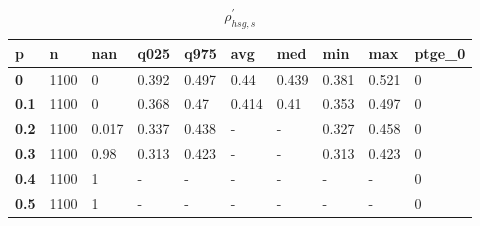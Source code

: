 \begin{table}[h]
 \centering 
\footnotesize
\caption{$\rho_{hsg,s}^\prime $}
\label{tab:alphahsgs}
\begin{tabular}[h]{|l|l|l|l|l|l|l|l|l|l|
    } \hline
\textbf{ p} & \textbf{ n} & \textbf{ nan} & \textbf{ q025} & \textbf{ q975} & \textbf{ avg} & \textbf{ med} & \textbf{ min} & \textbf{ max} & \textbf{ ptge\_0}
    \\ \hline
  \textbf{  0} & 1100 &     0 & 0.392 & 0.497 &  0.44 & 0.439 & 0.381 & 0.521 & 0
    \\ \hline
  \textbf{0.1} & 1100 &     0 & 0.368 &  0.47 & 0.414 &  0.41 & 0.353 & 0.497 & 0
    \\ \hline
  \textbf{0.2} & 1100 & 0.017 & 0.337 & 0.438 & - & - & 0.327 & 0.458 & 0
    \\ \hline
  \textbf{0.3} & 1100 &  0.98 & 0.313 & 0.423 & - & - & 0.313 & 0.423 & 0
    \\ \hline
  \textbf{0.4} & 1100 &     1 & - & - & - & - & - & - & 0
    \\ \hline
  \textbf{0.5} & 1100 &     1 & - & - & - & - & - & - & 0
    \\ \hline
 \end{tabular}
 \end{table}

